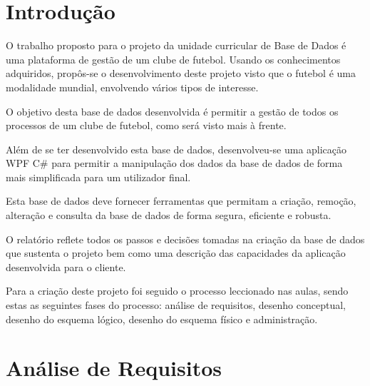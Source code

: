 \documentclass[pdftex,12pt,a4paper]{report}
\begin{document}
\renewcommand{\headrulewidth}{0pt}

\fancyhead{}
\fancyfoot{}
\rfoot{\thepage}

\renewcommand*\contentsname{Conteúdos}
\renewcommand*\figurename{Figura}
\renewcommand*\tablename{Tabela}

\tableofcontents
\renewcommand{\headrulewidth}{0.15pt}
\renewcommand{\thechapter}{}

\clearpage

\section{Introdução}
O trabalho proposto para o projeto da unidade curricular de Base de Dados é uma plataforma de gestão de um clube de futebol. Usando os conhecimentos adquiridos, propôs-se o desenvolvimento deste projeto visto que o futebol é uma modalidade mundial, envolvendo vários tipos de interesse. 

O objetivo desta base de dados desenvolvida é permitir a gestão de todos os processos de um clube de futebol, como será visto mais à frente.

Além de se ter desenvolvido esta base de dados, desenvolveu-se uma aplicação WPF C\# para permitir a manipulação dos dados da base de dados de forma mais simplificada para um utilizador final.

Esta base de dados deve fornecer ferramentas que permitam a criação, remoção, alteração e consulta da base de dados de forma segura, eficiente e robusta.

O relatório reflete todos os passos e decisões tomadas na criação da base de dados que sustenta o projeto bem como uma descrição das capacidades da aplicação desenvolvida para o cliente.

Para a criação deste projeto foi seguido o processo leccionado nas aulas, sendo estas as seguintes fases do processo: análise de requisitos, desenho conceptual, desenho do esquema lógico, desenho do esquema físico e administração.

\newpage
\section{Análise de Requisitos}
\end{document}
